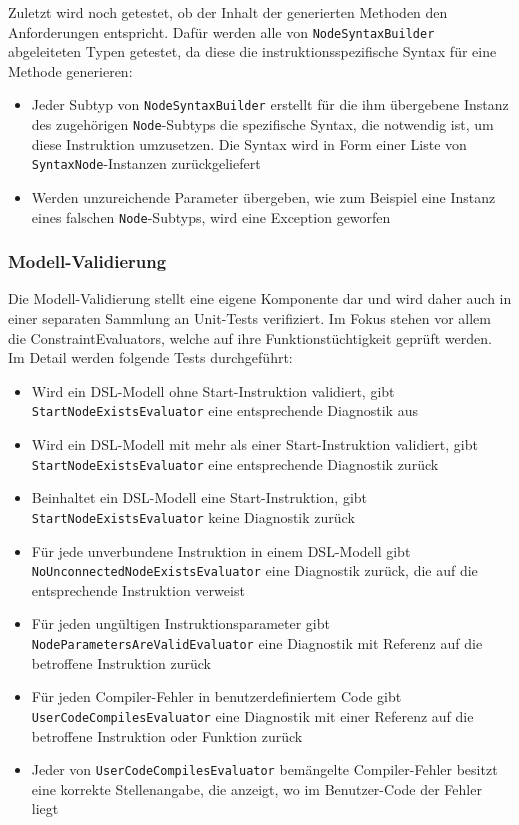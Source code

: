 \noindent Zuletzt wird noch getestet, ob der Inhalt der generierten Methoden den Anforderungen entspricht. Dafür werden alle von \texttt{NodeSyntaxBuilder} abgeleiteten Typen getestet, da diese die instruktionsspezifische Syntax  für eine Methode generieren:

\begin{itemize}
\item Jeder Subtyp von \texttt{NodeSyntaxBuilder} erstellt für die ihm übergebene Instanz des zugehörigen \texttt{Node}-Subtyps die spezifische Syntax, die notwendig ist, um diese Instruktion umzusetzen. Die Syntax wird in Form einer Liste von \texttt{SyntaxNode}-Instanzen zurückgeliefert 
\item Werden unzureichende Parameter übergeben, wie zum Beispiel eine Instanz eines falschen \texttt{Node}-Subtyps, wird eine Exception geworfen
\end{itemize}

\subsubsection{Modell-Validierung}  
Die Modell-Validierung stellt eine eigene Komponente dar und wird daher auch in einer separaten Sammlung an Unit-Tests verifiziert. Im Fokus stehen vor allem die ConstraintEvaluators, welche auf ihre Funktionstüchtigkeit geprüft werden. Im Detail werden folgende Tests durchgeführt:

\begin{itemize}
\item Wird ein DSL-Modell ohne Start-Instruktion validiert, gibt \texttt{Start\-Node\-Ex\-ists\-Eva\-lua\-tor} eine entsprechende Diagnostik aus
\item Wird ein DSL-Modell mit mehr als einer Start-Instruktion validiert, gibt \texttt{Start\-Node\-Ex\-ists\-E\-val\-u\-a\-tor} eine entsprechende Diagnostik zurück
\item Beinhaltet ein DSL-Modell eine Start-Instruktion, gibt \texttt{Start\-Node\-Ex\-ists\-Eva\-lua\-tor} keine Diagnostik zurück
\item Für jede unverbundene Instruktion in einem DSL-Modell gibt \texttt{No\-Un\-con\-nect\-ed\-Node\-Ex\-ists\-Eva\-lua\-tor} eine Diagnostik zurück, die auf die entsprechende Instruktion verweist
\item Für jeden ungültigen Instruktionsparameter gibt \texttt{Node\-Pa\-ra\-me\-ters\-Are\-Val\-id\-Eval\-u\-a\-tor} eine Diagnostik mit Referenz auf die betroffene Instruktion zurück
\item Für jeden Compiler-Fehler in benutzerdefiniertem Code gibt \texttt{U\-ser\-Code\-Com\-piles\-E\-val\-u\-a\-tor} eine Diagnostik mit einer Referenz auf die betroffene Instruktion oder Funktion zurück
\item Jeder von \texttt{U\-ser\-Code\-Com\-piles\-E\-val\-u\-a\-tor} bemängelte Compiler-Fehler besitzt eine korrekte Stellenangabe, die anzeigt, wo im Benutzer-Code der Fehler liegt
\end{itemize} 

